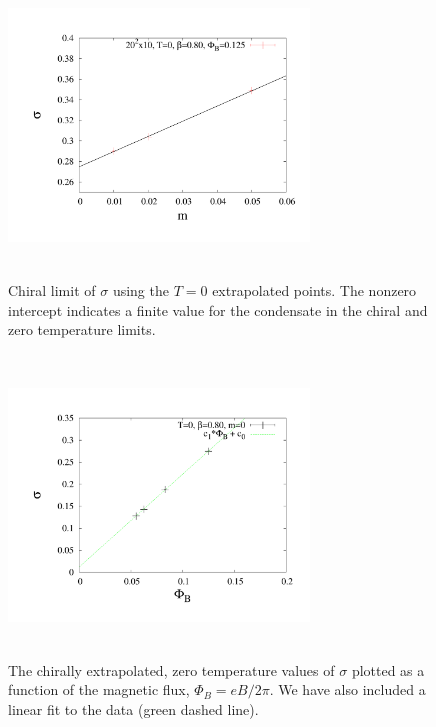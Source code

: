 \documentclass[aps,prd,twocolumn,showpacs,superscriptaddress,groupedaddress]{revtex4}  %
\begin{document}
\begin{figure}
  \includegraphics[height=8cm,width=8cm]{pbp_vs_m_zeroT_PHI0125_lin_graphene_paper.pdf} \hspace{-1cm}
\caption{Chiral limit of $\sigma$ using the $T=0$ extrapolated points. The nonzero intercept indicates a finite value for the condensate in the chiral and zero temperature limits.}
\label{PBPzeroTChiral}
\end{figure}

\begin{figure}
 \includegraphics[height=8cm,width=8cm]{pbp_vs_PHI_NL_graphene_paper.pdf} \hspace{-1cm}
\caption{The chirally extrapolated, zero temperature values of $\sigma$ plotted as a function of the magnetic flux,  $\Phi_B = eB/2\pi$. We have also included a linear
fit to the data (green dashed line).} 
\label{PBPzeroTChiralvseB}
\end{figure}
\end{document}
